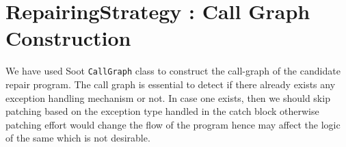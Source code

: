 

\chapter{RepairingStrategy : Call Graph Construction}
\label{chapter:callGraph}

We have used Soot \texttt{CallGraph} class to construct the call-graph of the
candidate repair program. The call graph is essential to detect if there
already exists any exception handling mechanism or not. In case one exists, then
we should skip patching based on the exception type handled in the catch block
otherwise patching effort would change the flow of the program hence may affect
the logic of the same which is not desirable.

